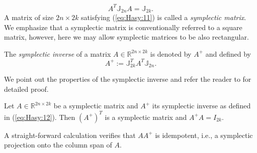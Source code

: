 \begin{equation} \label{eq:Hasy:11}
	A^T \mathbb{J}_{2n}A = \mathbb{J}_{2k}.
\end{equation}
A matrix of size $2n\times 2k$ satisfying (\ref{eq:Hasy:11}) is called a \emph{symplectic matrix}. {\blue We emphasize that a symplectic matrix is conventionally referred to a square matrix, however, here we may allow symplectic matrices to be also rectangular.}

\begin{definition}
	The \emph{symplectic inverse} of a matrix $A\in \mathbb{R}^{2n\times 2k}$ is denoted by $A^+$ and defined by {\edit \cite{Peng:2014di}}
\begin{equation}\label{eq:Hasy:12}
	A^+ := \mathbb{J}_{2k}^T A^T \mathbb{J}_{2n}.
\end{equation}
\end{definition}
We point out the properties of the symplectic inverse and refer the reader to \cite{Peng:2014di} for detailed proof.
\begin{lemma} \label{lemma:Hasy:1}
Let $A\in \mathbb{R}^{2n\times 2k}$ be a symplectic matrix and $A^+$ its symplectic inverse as defined in (\ref{eq:Hasy:12}). Then ${(A^+)}^T$ is a symplectic matrix and $A^+A = I_{2k}$.
\end{lemma}

{\edit A straight-forward calculation verifies} that $AA^+$ is idempotent, i.e., a symplectic projection onto the column span of $A$.

